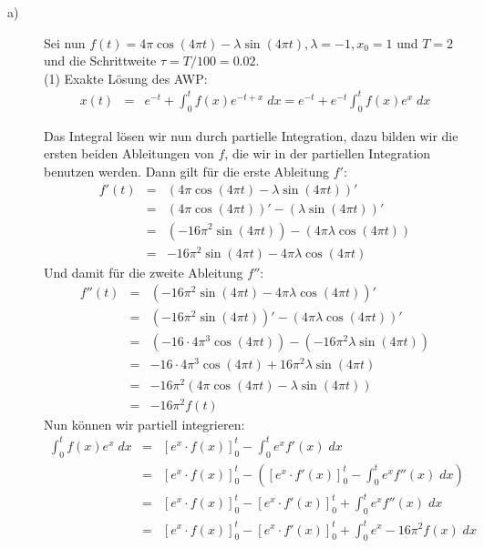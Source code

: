\documentclass[11pt,a4paper,ngerman]{article}
\begin{document}
\begin{description}
\item[a)] Sei nun $f(t) = 4\pi \cos(4\pi t) - \lambda \sin(4\pi t), \lambda = -1, x_0 = 1$ und $T = 2$ und die Schrittweite $\tau = T/100 = 0.02$. \\

(1) Exakte Lösung des AWP:
\begin{eqnarray*}
x(t) &=& e^{-t} + \int_0^t f(x) e^{-t+x} \; dx = e^{-t} + e^{-t} \int_0^t f(x)e^{x} \; dx
\end{eqnarray*}

Das Integral lösen wir nun durch partielle Integration, dazu bilden wir die ersten beiden Ableitungen von $f$, die wir in der partiellen Integration benutzen werden.
Dann gilt für die erste Ableitung $f'$:
\begin{eqnarray*}
f'(t) &=& (4\pi \cos(4\pi t) - \lambda \sin(4\pi t))' \\
&=& (4\pi \cos(4\pi t))' - (\lambda \sin(4\pi t))' \\
&=& (-16 \pi^2 \sin(4 \pi t)) - (4 \pi \lambda \cos(4 \pi t)) \\
&=& -16 \pi^2 \sin(4 \pi t) - 4 \pi \lambda \cos(4 \pi t)
\end{eqnarray*}
Und damit für die zweite Ableitung $f''$:
\begin{eqnarray*}
f''(t) &=& (-16 \pi^2 \sin(4 \pi t) - 4 \pi \lambda \cos(4 \pi t))' \\
&=& (-16 \pi^2 \sin(4 \pi t))' - (4 \pi \lambda \cos(4 \pi t))' \\
&=& (-16 \cdot 4 \pi^3 \cos(4 \pi t)) - (-16 \pi^2 \lambda \sin(4 \pi t)) \\
&=& -16 \cdot 4 \pi^3 \cos(4 \pi t) + 16 \pi^2 \lambda \sin(4 \pi t) \\
&=& -16 \pi^2 \left( 4 \pi \cos(4 \pi t) - \lambda \sin(4 \pi t)\right) \\
&=& -16 \pi^2 f(t)
\end{eqnarray*}
Nun können wir partiell integrieren:
\begin{eqnarray*}
\int_0^t f(x)e^{x} \; dx &=& [e^{x} \cdot f(x)]_0^t - \int_0^t e^{x} f'(x) \; dx \\
&=& [e^{x} \cdot f(x)]_0^t - \left([e^{x} \cdot f'(x)]_0^t - \int_0^t e^x f''(x) \; dx \right) \\
&=& [e^{x} \cdot f(x)]_0^t - [e^{x} \cdot f'(x)]_0^t + \int_0^t e^x f''(x) \; dx \\
&=& [e^{x} \cdot f(x)]_0^t - [e^{x} \cdot f'(x)]_0^t + \int_0^t e^x -16 \pi^2 f(x) \; dx \\

\end{eqnarray*}
\end{description}
\end{document}

